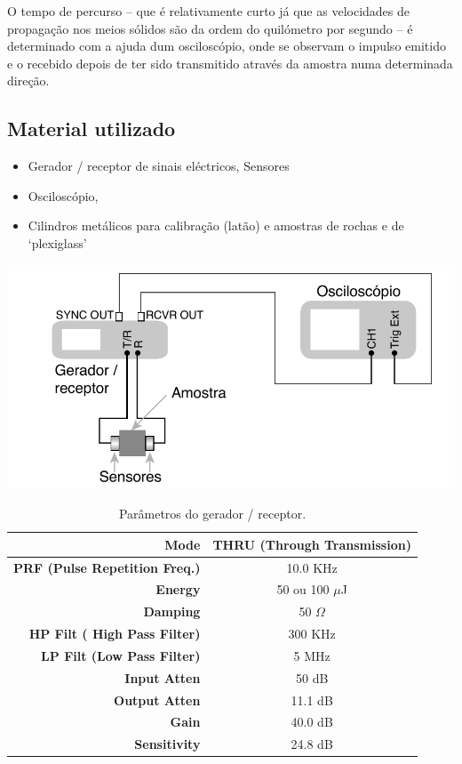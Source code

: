 \documentclass[a4paper,12pt]{article}
\begin{document}
O tempo de percurso -- que é relativamente curto já que as velocidades de propagação nos meios sólidos são da ordem do quilómetro por segundo -- é determinado com a ajuda dum osciloscópio, onde se observam o impulso emitido e o recebido depois de ter sido transmitido através da amostra numa determinada direção. 

\subsection{\sf Material utilizado}
\begin{itemize}
\item Gerador / receptor de sinais eléctricos, Sensores
\item Osciloscópio,
\item Cilindros metálicos para calibração (latão) e amostras de rochas e de ‘plexiglass’
\end{itemize}

\begin{center}
	\includegraphics[width=0.7\linewidth]{esquema}
\end{center}


\begin{table}[htp]
\caption{Parâmetros do gerador / receptor.}
\begin{center}
\begin{tabular}{|r|c|}
\hline
\bf{Mode} & THRU (Through Transmission)\\
\hline
\bf{PRF (Pulse Repetition Freq.)} & 10.0 KHz\\
\hline
\bf{Energy} & 50 ou 100 $\mu$J\\
\hline
\bf{Damping} & 50 $\Omega$\\
\hline
\bf{HP Filt ( High Pass Filter)} & 300 KHz\\
\hline
\bf{LP Filt (Low Pass Filter)} & 5 MHz\\
\hline
\bf{Input Atten} & 50 dB\\
\hline
\bf{Output Atten} & 11.1 dB\\
\hline
\bf{Gain} & 40.0 dB\\
\hline
\bf{Sensitivity} & 24.8 dB\\
\hline
\end{tabular}
\end{center}
\end{table}
\end{document}
